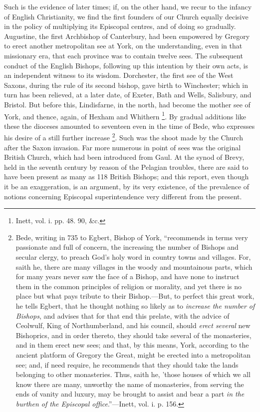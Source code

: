 Such is the evidence of later times; if, on the
other hand, we recur to the infancy of English Christianity, we find
the first founders of our Church equally decisive in the policy of
multiplying its Episcopal centres, and of doing so gradually.
Augustine, the first Archbishop of Canterbury, had been empowered by
Gregory to erect another metropolitan see at York, on the
understanding, even in that missionary era, that each province was to
contain twelve sees. The subsequent conduct of the English Bishops,
following up this intention by their own acts, is an independent
witness to its wisdom. Dorchester, the first see of the West Saxons,
during the rule of its second bishop, gave birth to Winchester; which
in turn has been relieved, at a later date, of Exeter, Bath and Wells,
Salisbury, and Bristol. But before this, Lindisfarne, in the north,
had become the mother see of York, and thence, again, of Hexham
and Whithern \footnote{Inett, vol. i. pp. 48. 90, \&c.}. By gradual
additions like these the dioceses amounted to seventeen even in the
time of Bede, who expresses his desire of a still further increase \footnote{Bede, writing in 735 to Egbert, Bishop of York, ``recommends in terms
very passionate and full of concern, the increasing the number of
Bishops and secular clergy, to preach God's holy word in country towns
and villages. For, saith he, there are many villages in the woody and
mountainous parts, which for many years never saw the face of a
Bishop, and have none to instruct them in the common principles of
religion or morality, and yet there is no place but what pays tribute
to their Bishop.—But, to perfect this great work, he tells Egbert,
that he thought nothing so likely as to \emph{increase the number of
Bishops}, and advises that for that end this prelate, with the
advice of Ceolwulf, King of Northumberland, and his council, should \emph{erect
several} new Bishoprics, and in order thereto, they should take
several of the monasteries, and in them erect new sees; and that, by
this means, York, according to the ancient platform of Gregory the
Great, might be erected into a metropolitan see; and, if need require,
he recommends that they should take the lands belonging to other
monasteries. Thus, saith he, 'those houses of which we all know there
are many, unworthy the name of monasteries, from serving the ends of
vanity and luxury, may be brought to assist and bear a part \emph{in the
burthen of the Episcopal office}.''—Inett, vol. i. p. 156.}. Such was the shoot made by the Church after the Saxon
invasion. Far more numerous in point of sees was the original British
Church, which had been introduced from Gaul. At the synod of Brevy,
held in the seventh century by reason of the Pelagian troubles, there
are said to have been present as many as 118 British Bishops; and this
report, even though it be an exaggeration, is an argument, by its very
existence, of the prevalence of notions concerning Episcopal
superintendence very different from the present.

